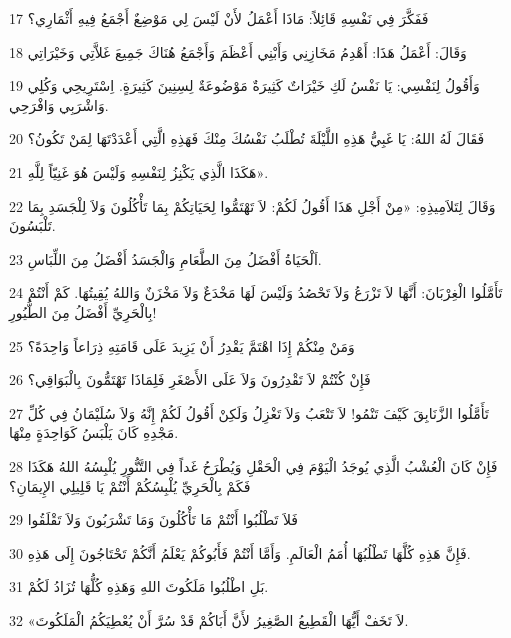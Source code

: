 \par 17 فَفَكَّرَ فِي نَفْسِهِ قَائِلاً: مَاذَا أَعْمَلُ لأَنْ لَيْسَ لِي مَوْضِعٌ أَجْمَعُ فِيهِ أَثْمَارِي؟
\par 18 وَقَالَ: أَعْمَلُ هَذَا: أَهْدِمُ مَخَازِنِي وَأَبْنِي أَعْظَمَ وَأَجْمَعُ هُنَاكَ جَمِيعَ غَلاَّتِي وَخَيْرَاتِي
\par 19 وَأَقُولُ لِنَفْسِي: يَا نَفْسُ لَكِ خَيْرَاتٌ كَثِيرَةٌ مَوْضُوعَةٌ لِسِنِينَ كَثِيرَةٍ. اِسْتَرِيحِي وَكُلِي وَاشْرَبِي وَافْرَحِي.
\par 20 فَقَالَ لَهُ اللهُ: يَا غَبِيُّ هَذِهِ اللَّيْلَةَ تُطْلَبُ نَفْسُكَ مِنْكَ فَهَذِهِ الَّتِي أَعْدَدْتَهَا لِمَنْ تَكُونُ؟
\par 21 هَكَذَا الَّذِي يَكْنِزُ لِنَفْسِهِ وَلَيْسَ هُوَ غَنِيّاً لِلَّهِ».
\par 22 وَقَالَ لِتَلاَمِيذِهِ: «مِنْ أَجْلِ هَذَا أَقُولُ لَكُمْ: لاَ تَهْتَمُّوا لِحَيَاتِكُمْ بِمَا تَأْكُلُونَ وَلاَ لِلْجَسَدِ بِمَا تَلْبَسُونَ.
\par 23 اَلْحَيَاةُ أَفْضَلُ مِنَ الطَّعَامِ وَالْجَسَدُ أَفْضَلُ مِنَ اللِّبَاسِ.
\par 24 تَأَمَّلُوا الْغِرْبَانَ: أَنَّهَا لاَ تَزْرَعُ وَلاَ تَحْصُدُ وَلَيْسَ لَهَا مَخْدَعٌ وَلاَ مَخْزَنٌ وَاللهُ يُقِيتُهَا. كَمْ أَنْتُمْ بِالْحَرِيِّ أَفْضَلُ مِنَ الطُّيُورِ!
\par 25 وَمَنْ مِنْكُمْ إِذَا اهْتَمَّ يَقْدِرُ أَنْ يَزِيدَ عَلَى قَامَتِهِ ذِرَاعاً وَاحِدَةً؟
\par 26 فَإِنْ كُنْتُمْ لاَ تَقْدِرُونَ وَلاَ عَلَى الأَصْغَرِ فَلِمَاذَا تَهْتَمُّونَ بِالْبَوَاقِي؟
\par 27 تَأَمَّلُوا الزَّنَابِقَ كَيْفَ تَنْمُو! لاَ تَتْعَبُ وَلاَ تَغْزِلُ وَلَكِنْ أَقُولُ لَكُمْ إِنَّهُ وَلاَ سُلَيْمَانُ فِي كُلِّ مَجْدِهِ كَانَ يَلْبَسُ كَوَاحِدَةٍ مِنْهَا.
\par 28 فَإِنْ كَانَ الْعُشْبُ الَّذِي يُوجَدُ الْيَوْمَ فِي الْحَقْلِ وَيُطْرَحُ غَداً فِي التَّنُّورِ يُلْبِسُهُ اللهُ هَكَذَا فَكَمْ بِالْحَرِيِّ يُلْبِسُكُمْ أَنْتُمْ يَا قَلِيلِي الإِيمَانِ؟
\par 29 فَلاَ تَطْلُبُوا أَنْتُمْ مَا تَأْكُلُونَ وَمَا تَشْرَبُونَ وَلاَ تَقْلَقُوا
\par 30 فَإِنَّ هَذِهِ كُلَّهَا تَطْلُبُهَا أُمَمُ الْعَالَمِ. وَأَمَّا أَنْتُمْ فَأَبُوكُمْ يَعْلَمُ أَنَّكُمْ تَحْتَاجُونَ إِلَى هَذِهِ.
\par 31 بَلِ اطْلُبُوا مَلَكُوتَ اللهِ وَهَذِهِ كُلُّهَا تُزَادُ لَكُمْ.
\par 32 «لاَ تَخَفْ أَيُّهَا الْقَطِيعُ الصَّغِيرُ لأَنَّ أَبَاكُمْ قَدْ سُرَّ أَنْ يُعْطِيَكُمُ الْمَلَكُوتَ.
